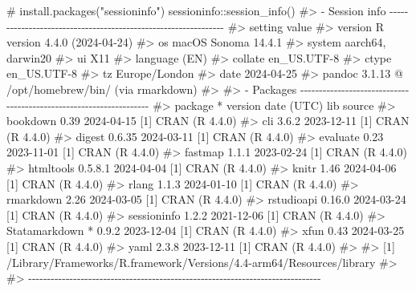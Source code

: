 \documentclass[
  10pt,
  a4paper,
]{book}
\newenvironment{Shaded}{\begin{snugshade}}{\end{snugshade}}
\newcommand{\CommentTok}[1]{\textcolor[rgb]{0.37,0.37,0.37}{#1}}
\newcommand{\FunctionTok}[1]{\textcolor[rgb]{0.28,0.35,0.67}{#1}}
\newcommand{\NormalTok}[1]{\textcolor[rgb]{0.00,0.46,0.62}{#1}}
\newcommand{\SpecialCharTok}[1]{\textcolor[rgb]{0.37,0.37,0.37}{#1}}
\begin{document}
\begin{Shaded}
\begin{Highlighting}[]
\CommentTok{\# install.packages("sessioninfo")}
\NormalTok{sessioninfo}\SpecialCharTok{::}\FunctionTok{session\_info}\NormalTok{()}
\CommentTok{\#\textgreater{} {-} Session info {-}{-}{-}{-}{-}{-}{-}{-}{-}{-}{-}{-}{-}{-}{-}{-}{-}{-}{-}{-}{-}{-}{-}{-}{-}{-}{-}{-}{-}{-}{-}{-}{-}{-}{-}{-}{-}{-}{-}{-}{-}{-}{-}{-}{-}{-}{-}{-}{-}{-}{-}{-}{-}{-}{-}{-}{-}{-}{-}{-}{-}{-}{-}}
\CommentTok{\#\textgreater{}  setting  value}
\CommentTok{\#\textgreater{}  version  R version 4.4.0 (2024{-}04{-}24)}
\CommentTok{\#\textgreater{}  os       macOS Sonoma 14.4.1}
\CommentTok{\#\textgreater{}  system   aarch64, darwin20}
\CommentTok{\#\textgreater{}  ui       X11}
\CommentTok{\#\textgreater{}  language (EN)}
\CommentTok{\#\textgreater{}  collate  en\_US.UTF{-}8}
\CommentTok{\#\textgreater{}  ctype    en\_US.UTF{-}8}
\CommentTok{\#\textgreater{}  tz       Europe/London}
\CommentTok{\#\textgreater{}  date     2024{-}04{-}25}
\CommentTok{\#\textgreater{}  pandoc   3.1.13 @ /opt/homebrew/bin/ (via rmarkdown)}
\CommentTok{\#\textgreater{} }
\CommentTok{\#\textgreater{} {-} Packages {-}{-}{-}{-}{-}{-}{-}{-}{-}{-}{-}{-}{-}{-}{-}{-}{-}{-}{-}{-}{-}{-}{-}{-}{-}{-}{-}{-}{-}{-}{-}{-}{-}{-}{-}{-}{-}{-}{-}{-}{-}{-}{-}{-}{-}{-}{-}{-}{-}{-}{-}{-}{-}{-}{-}{-}{-}{-}{-}{-}{-}{-}{-}{-}{-}{-}{-}}
\CommentTok{\#\textgreater{}  package       * version date (UTC) lib source}
\CommentTok{\#\textgreater{}  bookdown        0.39    2024{-}04{-}15 [1] CRAN (R 4.4.0)}
\CommentTok{\#\textgreater{}  cli             3.6.2   2023{-}12{-}11 [1] CRAN (R 4.4.0)}
\CommentTok{\#\textgreater{}  digest          0.6.35  2024{-}03{-}11 [1] CRAN (R 4.4.0)}
\CommentTok{\#\textgreater{}  evaluate        0.23    2023{-}11{-}01 [1] CRAN (R 4.4.0)}
\CommentTok{\#\textgreater{}  fastmap         1.1.1   2023{-}02{-}24 [1] CRAN (R 4.4.0)}
\CommentTok{\#\textgreater{}  htmltools       0.5.8.1 2024{-}04{-}04 [1] CRAN (R 4.4.0)}
\CommentTok{\#\textgreater{}  knitr           1.46    2024{-}04{-}06 [1] CRAN (R 4.4.0)}
\CommentTok{\#\textgreater{}  rlang           1.1.3   2024{-}01{-}10 [1] CRAN (R 4.4.0)}
\CommentTok{\#\textgreater{}  rmarkdown       2.26    2024{-}03{-}05 [1] CRAN (R 4.4.0)}
\CommentTok{\#\textgreater{}  rstudioapi      0.16.0  2024{-}03{-}24 [1] CRAN (R 4.4.0)}
\CommentTok{\#\textgreater{}  sessioninfo     1.2.2   2021{-}12{-}06 [1] CRAN (R 4.4.0)}
\CommentTok{\#\textgreater{}  Statamarkdown * 0.9.2   2023{-}12{-}04 [1] CRAN (R 4.4.0)}
\CommentTok{\#\textgreater{}  xfun            0.43    2024{-}03{-}25 [1] CRAN (R 4.4.0)}
\CommentTok{\#\textgreater{}  yaml            2.3.8   2023{-}12{-}11 [1] CRAN (R 4.4.0)}
\CommentTok{\#\textgreater{} }
\CommentTok{\#\textgreater{}  [1] /Library/Frameworks/R.framework/Versions/4.4{-}arm64/Resources/library}
\CommentTok{\#\textgreater{} }
\CommentTok{\#\textgreater{} {-}{-}{-}{-}{-}{-}{-}{-}{-}{-}{-}{-}{-}{-}{-}{-}{-}{-}{-}{-}{-}{-}{-}{-}{-}{-}{-}{-}{-}{-}{-}{-}{-}{-}{-}{-}{-}{-}{-}{-}{-}{-}{-}{-}{-}{-}{-}{-}{-}{-}{-}{-}{-}{-}{-}{-}{-}{-}{-}{-}{-}{-}{-}{-}{-}{-}{-}{-}{-}{-}{-}{-}{-}{-}{-}{-}{-}{-}}
\end{Highlighting}
\end{Shaded}


  

\backmatter
\end{document}
